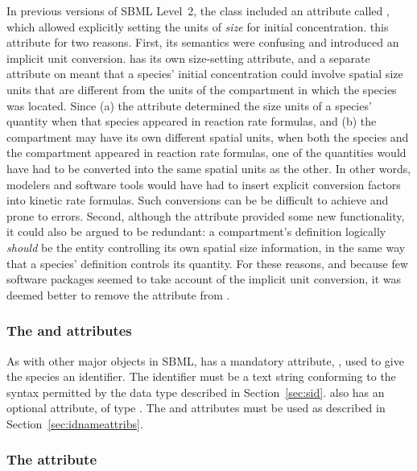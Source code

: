 In previous versions of SBML Level~2, the class \Species included
an attribute called , which allowed
explicitly setting the units of \emph{size} for initial
concentration.  \sbmltwothree {} this attribute for two
reasons.  First, its semantics were confusing and introduced an
implicit unit conversion.  \Compartment has its own size-setting
attribute, and a separate attribute on \Species meant that a
species' initial concentration could involve spatial size units
that are different from the units of the compartment in which the
species was located.  Since (a) the 
attribute determined the size units of a species' quantity when
that species appeared in reaction rate formulas, and (b) the
compartment may have its own different spatial units, when both
the species and the compartment appeared in reaction rate
formulas, one of the quantities would have had to be converted
into the same spatial units as the other.  In other words,
modelers and software tools would have had to insert explicit
conversion factors into kinetic rate formulas.  Such conversions
can be be difficult to achieve and prone to errors.  Second,
although the  attribute provided
some new functionality, it could also be argued to be redundant:
a compartment's definition logically \emph{should} be the
entity controlling its own spatial size information, in the same
way that a species' definition controls its quantity.  For these
reasons, and because few software packages seemed to take account
of the implicit unit conversion, it was deemed better to remove
the  attribute from \Species.


\subsubsection{The  and  attributes}

As with other major objects in SBML, \Species has a mandatory
attribute, , used to give the species an identifier.  The
identifier must be a text string conforming to the syntax
permitted by the  data type described in
Section~\ref{sec:sid}.  \Species also has an optional 
attribute, of type .  The  and 
attributes must be used as described in
Section~\ref{sec:idnameattribs}.



\subsubsection{The  attribute}
\label{sec:species-species-type}

